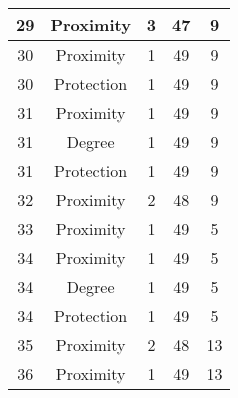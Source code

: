 \documentclass[results.tex]{subfiles}
\begin{document}
\begin{center}
\begin{tabular}{| c || c | c | c | c |}
            \hline
            29                      & Proximity                    & 3                      & 47                      & 9                    \\
            \hline
            30                      & Proximity                    & 1                      & 49                      & 9                    \\
            \hline
            30                      & Protection                   & 1                      & 49                      & 9                    \\
            \hline
            31                      & Proximity                    & 1                      & 49                      & 9                    \\
            \hline
            31                      & Degree                       & 1                      & 49                      & 9                    \\
            \hline
            31                      & Protection                   & 1                      & 49                      & 9                    \\
            \hline
            32                      & Proximity                    & 2                      & 48                      & 9                    \\
            \hline
            33                      & Proximity                    & 1                      & 49                      & 5                    \\
            \hline
            34                      & Proximity                    & 1                      & 49                      & 5                    \\
            \hline
            34                      & Degree                       & 1                      & 49                      & 5                    \\
            \hline
            34                      & Protection                   & 1                      & 49                      & 5                    \\
            \hline
            35                      & Proximity                    & 2                      & 48                      & 13                   \\
            \hline
            36                      & Proximity                    & 1                      & 49                      & 13                   \\

\end{tabular}
\end{center}
\end{document}
